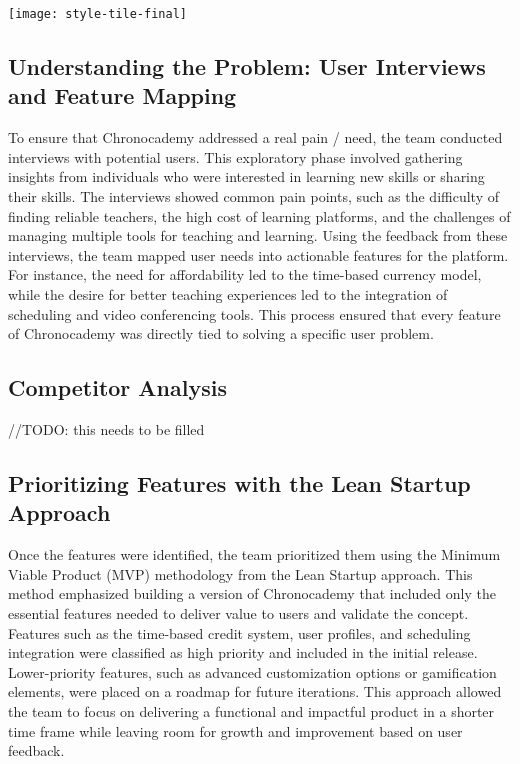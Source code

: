 \texttt{[image: style-tile-final]}\newline

\subsection{Understanding the Problem: User Interviews and Feature Mapping}\label{subsec:user-interviews-feature-mapping}
To ensure that Chronocademy addressed a real pain / need, the team conducted interviews with potential users.
This exploratory phase involved gathering insights from individuals who were interested in learning new skills or sharing their skills.
The interviews showed common pain points, such as the difficulty of finding reliable teachers, the high cost of learning platforms, and the challenges of managing multiple tools for teaching and learning.
Using the feedback from these interviews, the team mapped user needs into actionable features for the platform.
For instance, the need for affordability led to the time-based currency model, while the desire for better teaching experiences led to the integration of scheduling and video conferencing tools.
This process ensured that every feature of Chronocademy was directly tied to solving a specific user problem.

\subsection{Competitor Analysis}\label{subsec:competitor-analysis}
//TODO: this needs to be filled

\subsection{Prioritizing Features with the Lean Startup Approach}\label{subsec:prioritizing-features-with-the-lean-startup-approach}
Once the features were identified, the team prioritized them using the Minimum Viable Product (MVP) methodology from the Lean Startup approach.
This method emphasized building a version of Chronocademy that included only the essential features needed to deliver value to users and validate the concept.
Features such as the time-based credit system, user profiles, and scheduling integration were classified as high priority and included in the initial release.
Lower-priority features, such as advanced customization options or gamification elements, were placed on a roadmap for future iterations.
This approach allowed the team to focus on delivering a functional and impactful product in a shorter time frame while leaving room for growth and improvement based on user feedback.
